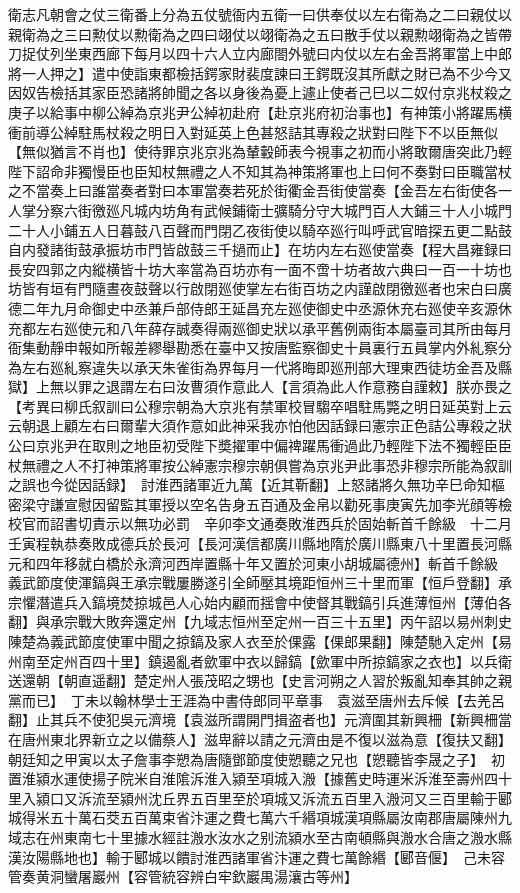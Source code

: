 衛志凡朝會之仗三衛番上分為五仗號衙内五衛一曰供奉仗以左右衛為之二曰親仗以親衛為之三曰勲仗以勲衛為之四曰翊仗以翊衛為之五曰散手仗以親勲翊衛為之皆帶刀捉仗列坐東西廊下每月以四十六人立内廊閤外號曰内仗以左右金吾將軍當上中郎將一人押之】遣中使詣東都檢括鍔家財裴度諫曰王鍔既沒其所獻之財已為不少今又因奴告檢括其家臣恐諸將帥聞之各以身後為憂上遽止使者己巳以二奴付京兆杖殺之　庚子以給事中柳公綽為京兆尹公綽初赴府【赴京兆府初治事也】有神策小將躍馬横衝前導公綽駐馬杖殺之明日入對延英上色甚怒詰其專殺之狀對曰陛下不以臣無似【無似猶言不肖也】使待罪京兆京兆為輦轂師表今視事之初而小將敢爾唐突此乃輕陛下詔命非獨慢臣也臣知杖無禮之人不知其為神策將軍也上曰何不奏對曰臣職當杖之不當奏上曰誰當奏者對曰本軍當奏若死於街衢金吾街使當奏【金吾左右街使各一人掌分察六街徼廵凡城内坊角有武候鋪衛士彍騎分守大城門百人大鋪三十人小城門二十人小鋪五人日暮鼓八百聲而門閉乙夜街使以騎卒廵行叫呼武官暗探五更二點鼓自内發諸街鼓承振坊市門皆啟鼓三千撾而止】在坊内左右廵使當奏【程大昌雍録曰長安四郭之内縱横皆十坊大率當為百坊亦有一面不啻十坊者故六典曰一百一十坊也坊皆有垣有門隨晝夜鼓聲以行啟閉廵使掌左右街百坊之内謹啟閉徼廵者也宋白曰廣德二年九月命御史中丞兼戶部侍郎王延昌充左廵使御史中丞源休充右廵使辛亥源休充都左右廵使元和八年薛存誠奏得兩廵御史狀以承平舊例兩街本屬臺司其所由每月衙集動靜申報如所報差繆舉勘悉在臺中又按唐監察御史十員裏行五員掌内外糺察分為左右廵糺察違失以承天朱雀街為界每月一代將晦即廵刑部大理東西徒坊金吾及縣獄】上無以罪之退謂左右曰汝曹須作意此人【言須為此人作意務自謹敕】朕亦畏之　【考異曰柳氏叙訓曰公穆宗朝為大京兆有禁軍校冒騶卒唱駐馬斃之明日延英對上云云朝退上顧左右曰爾輩大須作意如此神采我亦怕他因話録曰憲宗正色詰公專殺之狀公曰京兆尹在取則之地臣初受陛下奬擢軍中偏禆躍馬衝過此乃輕陛下法不獨輕臣臣杖無禮之人不打神策將軍按公綽憲宗穆宗朝俱嘗為京兆尹此事恐非穆宗所能為叙訓之誤也今從因話録】　討淮西諸軍近九萬【近其靳翻】上怒諸將久無功辛巳命知樞密梁守謙宣慰因留監其軍授以空名告身五百通及金帛以勸死事庚寅先加李光顔等檢校官而詔書切責示以無功必罰　辛卯李文通奏敗淮西兵於固始斬首千餘級　十二月壬寅程執恭奏敗成德兵於長河【長河漢信都廣川縣地隋於廣川縣東八十里置長河縣元和四年移就白橋於永濟河西岸置縣十年又置於河東小胡城屬德州】斬首千餘級　義武節度使渾鎬與王承宗戰屢勝遂引全師壓其境距恒州三十里而軍【恒戶登翻】承宗懼潛遣兵入鎬境焚掠城邑人心始内顧而揺會中使督其戰鎬引兵進薄恒州【薄伯各翻】與承宗戰大敗奔還定州【九域志恒州至定州一百三十五里】丙午詔以易州刺史陳楚為義武節度使軍中聞之掠鎬及家人衣至於倮露【倮郎果翻】陳楚馳入定州【易州南至定州百四十里】鎮遏亂者歛軍中衣以歸鎬【歛軍中所掠鎬家之衣也】以兵衛送還朝【朝直遥翻】楚定州人張茂昭之甥也【史言河朔之人習於叛亂知奉其帥之親黨而已】　丁未以翰林學士王涯為中書侍郎同平章事　袁滋至唐州去斥候【去羌呂翻】止其兵不使犯吳元濟境【袁滋所謂開門揖盗者也】元濟圍其新興柵【新興柵當在唐州東北界新立之以備蔡人】滋卑辭以請之元濟由是不復以滋為意【復扶又翻】朝廷知之甲寅以太子詹事李愬為唐隨鄧節度使愬聽之兄也【愬聽皆李晟之子】　初置淮潁水運使揚子院米自淮隂泝淮入潁至項城入溵【據舊史時運米泝淮至壽州四十里入潁口又泝流至潁州沈丘界五百里至於項城又泝流五百里入溵河又三百里輸于郾城得米五十萬石茭五百萬束省汴運之費七萬六千緡項城漢項縣屬汝南郡唐屬陳州九域志在州東南七十里據水經註溵水汝水之别流潁水至古南頓縣與溵水合唐之溵水縣漢汝陽縣地也】輸于郾城以饋討淮西諸軍省汴運之費七萬餘緡【郾音偃】　己未容管奏黄洞蠻屠巖州【容管統容辨白牢欽巖禺湯瀼古等州】

